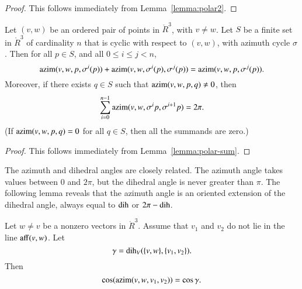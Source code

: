 \begin{proof} This follows immediately from Lemma~\ref{lemma:polar2}.
\end{proof}

\begin{lemma} \label{lemma:2pi-sum}
Let $(v,w)$ be an ordered pair of points in $\ring{R}^3$,
with $v\ne w$.  Let $S$ be a finite set in $\ring{R}^3$ of
cardinality $n$ that
is cyclic with respect to $(v,w)$,
with azimuth cycle $\sigma$.
Then for all $p\in S$,
and all $0\le i \le j < n$,
   $$
   {\operatorname{azim}}(v,w,p,\sigma^i(p)) +
    {\operatorname{azim}}(v,w,\sigma^i(p),\sigma^j(p)) =
   {\operatorname{azim}}(v,w,p,\sigma^j(p)).
   $$
Moreover, if there exists $q\in S$ such that 
${\operatorname{azim}}(v,w,p,q)\ne0$,
then
  $$
  \sum_{i=0}^{n-1} {\operatorname{azim}}(v,w,\sigma^ip,\sigma^{i+1}p) = 2\pi.
  $$
(If ${\operatorname{azim}}(v,w,p,q)=0$ for all $q\in S$, then all the
summands are zero.)
\end{lemma}
%
%
%
%
%

\begin{proof} This follows immediately from 
Lemma~\ref{lemma:polar-sum}.
\end{proof}


The azimuth and dihedral angles are closely related.   
The azimuth angle takes values between $0$ and $2\pi$, but the dihedral
angle is never greater than $\pi$.  The following lemma reveals that
the azimuth angle is an oriented extension of the dihedral angle, always
equal to $\operatorname{dih}$ or $2\pi - \operatorname{dih}$.
%
%
%
%


\begin{lemma}\label{lemma:dih-azim}
Let $w\ne v$ be a nonzero vectors in $\ring{R}^3$.
  Assume that $v_1$ and $v_2$ do not lie in the line ${\operatorname{aff}}(v,w)$.
Let
  $$\gamma = \operatorname{dih}_V(\{v,w\},\{v_1,v_2\}).$$
  Then
    $$
    \cos({\operatorname{azim}}(v,w,v_1,v_2)) = \cos\gamma.
    $$
\end{lemma}

